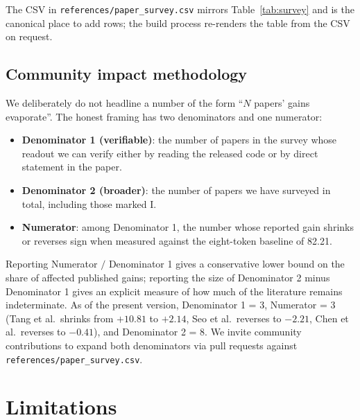\documentclass[11pt,letterpaper]{article}
\begin{document}
The CSV in \texttt{references/paper\_survey.csv} mirrors
Table~\ref{tab:survey} and is the canonical place to add rows;
the build process re-renders the table from the CSV on request.

\subsection{Community impact methodology}
\label{sec:impact-methodology}

We deliberately do not headline a number of the form ``$N$ papers'
gains evaporate''. The honest framing has two denominators and one
numerator:

\begin{itemize}[leftmargin=*,nosep]
\item \textbf{Denominator 1 (verifiable)}: the number of papers in
      the survey whose readout we can verify either by reading the
      released code or by direct statement in the paper.
\item \textbf{Denominator 2 (broader)}: the number of papers we have
      surveyed in total, including those marked I.
\item \textbf{Numerator}: among Denominator 1, the number whose
      reported gain shrinks or reverses sign when measured against
      the eight-token baseline of 82.21.
\end{itemize}

Reporting Numerator $/$ Denominator 1 gives a conservative lower
bound on the share of affected published gains; reporting the size
of Denominator 2 minus Denominator 1 gives an explicit measure of
how much of the literature remains indeterminate. As of the present
version, Denominator 1 = 3, Numerator = 3 (Tang et al.\ shrinks from
$+10.81$ to $+2.14$, Seo et al.\ reverses to $-2.21$, Chen et al.\
reverses to $-0.41$), and Denominator 2 = 8. We invite community
contributions to expand both denominators via pull requests against
\texttt{references/paper\_survey.csv}.

\section{Limitations}
\label{sec:limitations}
\end{document}
